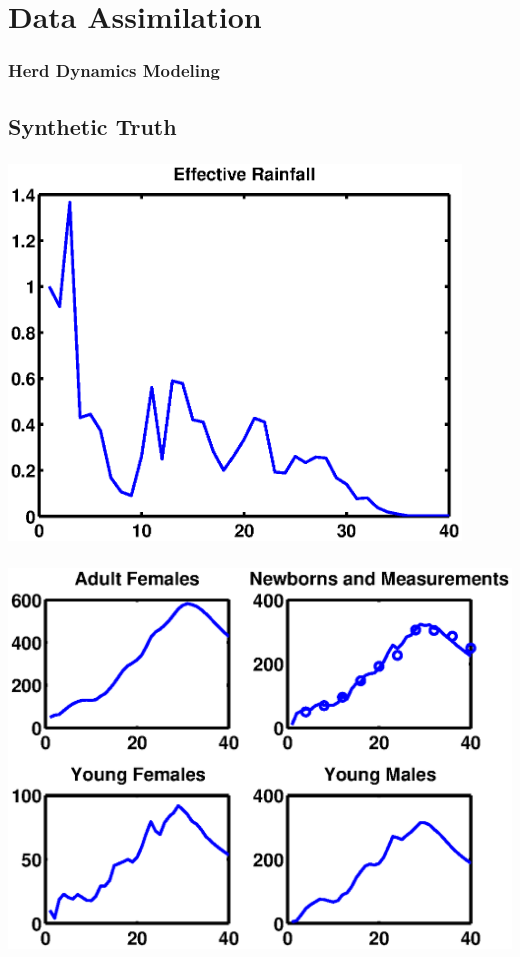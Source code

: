 \documentclass[mathserif]{beamer}
\begin{document}
\section{Data Assimilation}

\begin{frame}
\frametitle{Herd Dynamics Modeling}
\tableofcontents[currentsection]
\end{frame}

\subsection{Synthetic Truth}
\begin{frame}
\begin{center}
\frametitle{\insertsubsection}
\includegraphics[width=0.9\textwidth]{forcing}
\end{center}
\end{frame}

\begin{frame}
\begin{center}
\frametitle{\insertsubsection}
\includegraphics[width=1\textwidth]{truth}
\end{center}
\end{frame}
\end{document}
